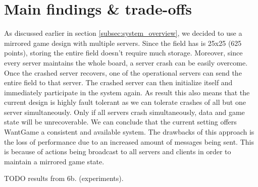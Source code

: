 \section{Main findings \& trade-offs}


	As discussed earlier in section \ref{subsec:system_overview}, we decided to use a mirrored game design with multiple servers. 
	Since the field has is 25x25 (625 points), storing the entire field doesn't require much storage. 
	Moreover, since every server maintains the whole board, a server crash can be easily overcome.
	Once the crashed server recovers, one of the operational servers can send the entire field to that server. 
	The crashed server can then initialize itself and immediately participate in the system again. 
	As result this also means that the current design is highly fault tolerant as we can tolerate crashes of all but one server simultaneously. 
	Only if all servers crash simultaneously, data and game state will be unrecoverable.
	We can conclude that the current setting offers WantGame a consistent and available system. 
	The drawbacks of this approach is the loss of performance due to an increased amount of messages being sent. This is because of actions being broadcast to all servers and clients in order to maintain a mirrored game state.
	
	TODO results from 6b. (experiments).